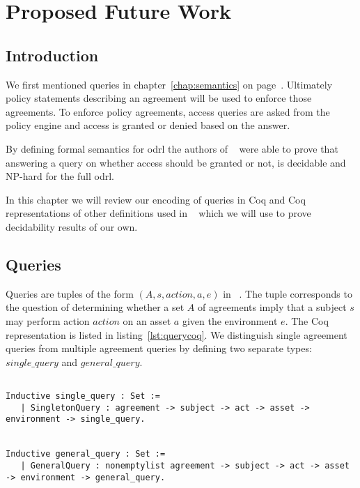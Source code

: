 \chapter{Proposed Future Work}

\section{Introduction}

We first mentioned queries in chapter~\ref{chap:semantics} on page~\pageref{chap:semantics}. Ultimately policy statements describing an agreement will be used to enforce those agreements. To enforce policy agreements, access queries are asked from the policy engine and access is granted or denied based on the answer.

By defining formal semantics for \ac{odrl} the authors of ~\cite{pucella2006} were able to prove that answering a query on whether access should be granted or not, is decidable and NP-hard for the full \ac{odrl}. 

In this chapter we will review our encoding of queries in Coq and Coq representations of other definitions used in ~\cite{pucella2006} which we will use to prove decidability results of our own. 


\section{Queries}

Queries are tuples of the form $(A, s, action, a, e)$ in ~\cite{pucella2006}. The tuple corresponds to the question of determining whether a set $A$ of agreements imply that a subject $s$ may perform action $action$ on an asset $a$ given the environment $e$. The Coq representation is listed in listing~\ref{lst:querycoq}. We distinguish single agreement queries from multiple agreement queries by defining two separate types: $single\_query$ and $general\_query$.

\begin{minipage}[c]{0.95\textwidth}
\begin{lstlisting}

Inductive single_query : Set := 
   | SingletonQuery : agreement -> subject -> act -> asset -> environment -> single_query.
   

Inductive general_query : Set := 
   | GeneralQuery : nonemptylist agreement -> subject -> act -> asset -> environment -> general_query.
\end{lstlisting}
\end{minipage}

